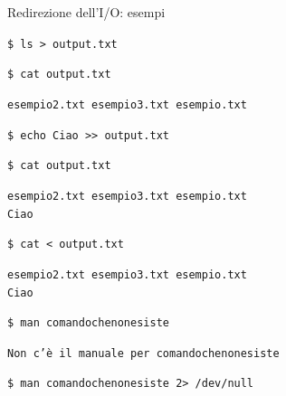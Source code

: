 \documentclass{beamer}
\begin{document}
    \begin{frame}{Redirezione dell'I/O: esempi}
        \small

        \begin{exampleblock}{}
            \texttt{\$ ls > output.txt}

            \texttt{\$ cat output.txt}

            \texttt{esempio2.txt esempio3.txt esempio.txt}

            \vspace{0.25cm}

            \texttt{\$ echo Ciao >> output.txt}

            \texttt{\$ cat output.txt}

            \texttt{esempio2.txt esempio3.txt esempio.txt \\ Ciao}

            \vspace{0.25cm}
            
            \texttt{\$ cat < output.txt}

            \texttt{esempio2.txt esempio3.txt esempio.txt \\ Ciao}

            \texttt{\$ man comandochenonesiste}

            \texttt{Non c'è il manuale per comandochenonesiste}

            \vspace{0.25cm}

            \texttt{\$ man comandochenonesiste 2> /dev/null}

            \vspace{0.05cm}
        \end{exampleblock}
    \end{frame}
\end{document}
